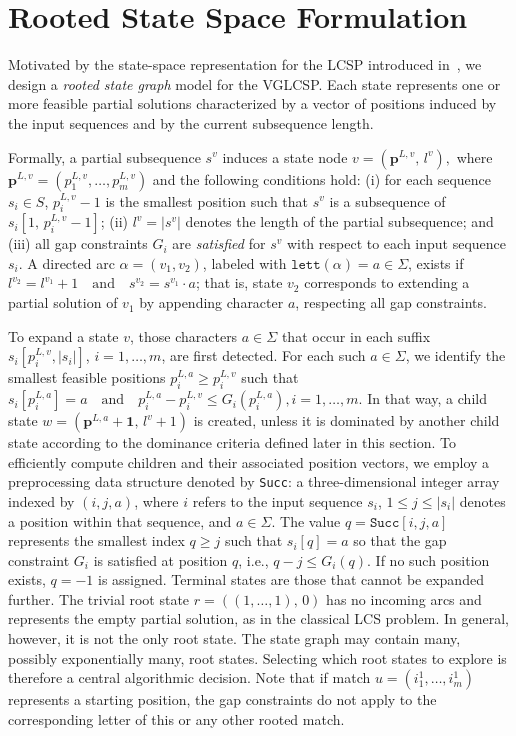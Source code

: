 \documentclass[runningheads]{llncs}
\begin{document}
	
	\section{Rooted State Space Formulation}\label{sec: state_graph}
	
	
	Motivated by the state-space representation for the LCSP introduced in~\cite{DJUKANOVIC2020106499}, we design a \emph{rooted state graph} model for the VGLCSP. Each state represents one or more feasible partial solutions characterized by a vector of positions induced by the input sequences and by the current subsequence length. 
	
	Formally, a partial subsequence $s^v$ induces a state node $
	v = (\mathbf{p}^{L,v},\, l^v),$ 
	where $\mathbf{p}^{L,v} = (p^{L,v}_1,\ldots,p^{L,v}_m)$ and the following conditions hold:
	(i) for each sequence $s_i \in S$, $p^{L,v}_i - 1$ is the smallest position such that $s^v$ is a subsequence of $s_i[1,\, p^{L,v}_i - 1]$;
	(ii) $l^v = |s^v|$ denotes the length of the partial subsequence; and
	(iii) all gap constraints $G_i$ are \textit{satisfied} for $s^v$ with respect to each input sequence $s_i$. A directed arc $\alpha = (v_1, v_2)$, labeled with $\texttt{lett}(\alpha) = a \in \Sigma$, exists if $
	l^{v_2} = l^{v_1} + 1
	\quad \text{and} \quad
	s^{v_2} = s^{v_1} \cdot a$; 
	that is, state $v_2$ corresponds to extending a partial solution of $v_1$ by appending character $a$, respecting all gap constraints. 
	
	To expand a state $v$, those characters $a \in \Sigma$ that occur in each suffix  $s_i[p^{L,v}_i, |s_i|]$, $i = 1,\ldots,m$, are first detected. For each such $a \in \Sigma$, we identify the smallest feasible positions $p^{L,a}_i \ge p^{L,v}_i$ such that
	$
	s_i[p^{L,a}_i] = a
	\quad \text{and} \quad
	p^{L,a}_i - p^{L,v}_i \le G_i(p^{L,a}_i), i = 1,\ldots,m.
	$ 
	In that way, a child state
	$w = (\mathbf{p}^{L,a} + \mathbf{1},\, l^v + 1)$
	is created, unless it is dominated by another child state according to the dominance criteria defined later in this section. To efficiently compute children and their associated position vectors, we employ a preprocessing data structure denoted by \texttt{Succ}: a three-dimensional integer array indexed by $(i,j, a)$, where $i$ refers to the input sequence $s_i$, $1 \le j \le |s_i|$ denotes a position within that sequence, and $a \in \Sigma$. The value $q = \texttt{Succ}[i,j,a]$
	represents the smallest index $q \ge j$ such that $s_i[q] = a$ so that the gap constraint $G_i$ is satisfied at position $q$, i.e.,  $q - j \le G_i(q).$ 
	If no such position exists, $q=-1$ is assigned.  Terminal states are those that cannot be expanded further. The trivial root state $r=((1,\ldots,1),\,0)$ has no incoming arcs and represents the empty partial solution, as in the classical LCS problem. In general, however, it is not the only root state. The state graph may contain many, possibly exponentially many, root states. Selecting which root states to explore is therefore a central algorithmic decision. %
	Note that if match $u=(i^1_1, \ldots, i^1_m)$ represents a starting position,   the gap constraints do not apply to the corresponding letter of this or any other  rooted match. 
	
\end{document}
